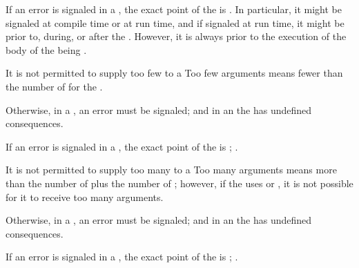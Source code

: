 
If an error is signaled in a ,
the exact point of the  is .
In particular, it might be signaled at compile time or at run time,
and if signaled at run time, 
it might be prior to, during, or after  the .
However, it is always prior to the execution of the body of the  
being .

\endsubsubsubsection%

\endsubsubsection%


It is not permitted to supply too few  to a 
Too few arguments means fewer  than the number of  
for the .

Otherwise, in a , an error  must be signaled;
and in an  the  has undefined consequences.

If an error is signaled in a ,
the exact point of the  is ;
\seesection\SafeCallDetectionTime.

\endsubsubsection%

It is not permitted to supply too many  to a 
Too many arguments means more  than the number of 
plus the number of ; however, if the  
uses  or , it is not possible for it to receive too many arguments.

Otherwise, in a , an error  must be signaled;
and in an  the  has undefined consequences.

If an error is signaled in a ,
the exact point of the  is ;
\seesection\SafeCallDetectionTime.

\endsubsubsection%

